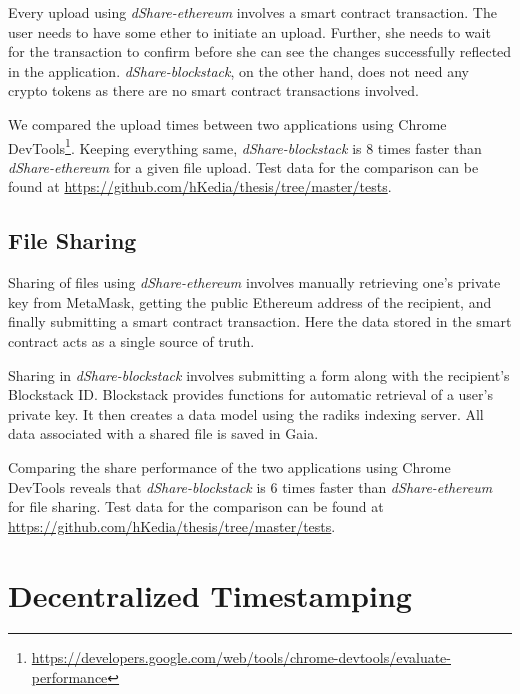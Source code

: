		Every upload using \textit{dShare-ethereum} involves a smart contract transaction. The user needs to have some ether to initiate an upload. Further, she needs to wait for the transaction to confirm before she can see the changes successfully reflected in the application. \textit{dShare-blockstack}, on the other hand, does not need any crypto tokens as there are no smart contract transactions involved.
		
		We compared the upload times between two applications using Chrome DevTools\footnote{\url{https://developers.google.com/web/tools/chrome-devtools/evaluate-performance}}. Keeping everything same, \textit{dShare-blockstack} is 8 times faster than \textit{dShare-ethereum} for a given file upload. Test data for the comparison can be found at \url{https://github.com/hKedia/thesis/tree/master/tests}.
		
		\subsection{File Sharing}
		Sharing of files using \textit{dShare-ethereum} involves manually retrieving one's private key from MetaMask, getting the public Ethereum address of the recipient, and finally submitting a smart contract transaction. Here the data stored in the smart contract acts as a single source of truth.
		
		Sharing in \textit{dShare-blockstack} involves submitting a form along with the recipient's Blockstack ID. Blockstack provides functions for automatic retrieval of a user's private key. It then creates a data model using the radiks indexing server. All data associated with a shared file is saved in Gaia.
		
		Comparing the share performance of the two applications using Chrome DevTools reveals that \textit{dShare-blockstack} is 6 times faster than \textit{dShare-ethereum} for file sharing. Test data for the comparison can be found at \url{https://github.com/hKedia/thesis/tree/master/tests}.
		
	\section{Decentralized Timestamping}
	
